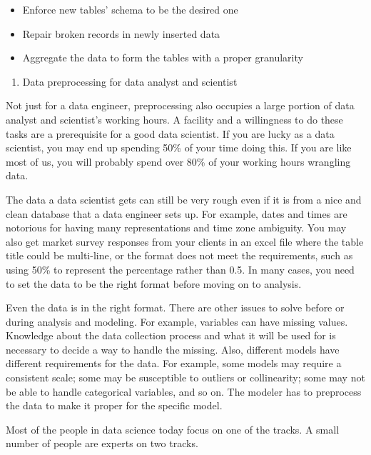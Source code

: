 \documentclass[
  12pt,
]{krantz}
\providecommand{\tightlist}{%
  \setlength{\itemsep}{0pt}\setlength{\parskip}{0pt}}
\begin{document}
\begin{itemize}
\tightlist
\item
  Enforce new tables' schema to be the desired one
\item
  Repair broken records in newly inserted data
\item
  Aggregate the data to form the tables with a proper granularity
\end{itemize}

\begin{enumerate}
\def\labelenumi{(\arabic{enumi})}
\setcounter{enumi}{1}
\tightlist
\item
  Data preprocessing for data analyst and scientist
\end{enumerate}

Not just for a data engineer, preprocessing also occupies a large portion of data analyst and scientist's working hours. A facility and a willingness to do these tasks are a prerequisite for a good data scientist. If you are lucky as a data scientist, you may end up spending 50\% of your time doing this. If you are like most of us, you will probably spend over 80\% of your working hours wrangling data.

The data a data scientist gets can still be very rough even if it is from a nice and clean database that a data engineer sets up. For example, dates and times are notorious for having many representations and time zone ambiguity. You may also get market survey responses from your clients in an excel file where the table title could be multi-line, or the format does not meet the requirements, such as using 50\% to represent the percentage rather than 0.5. In many cases, you need to set the data to be the right format before moving on to analysis.

Even the data is in the right format. There are other issues to solve before or during analysis and modeling. For example, variables can have missing values. Knowledge about the data collection process and what it will be used for is necessary to decide a way to handle the missing. Also, different models have different requirements for the data. For example, some models may require a consistent scale; some may be susceptible to outliers or collinearity; some may not be able to handle categorical variables, and so on. The modeler has to preprocess the data to make it proper for the specific model.

Most of the people in data science today focus on one of the tracks. A small number of people are experts on two tracks.
\end{document}
